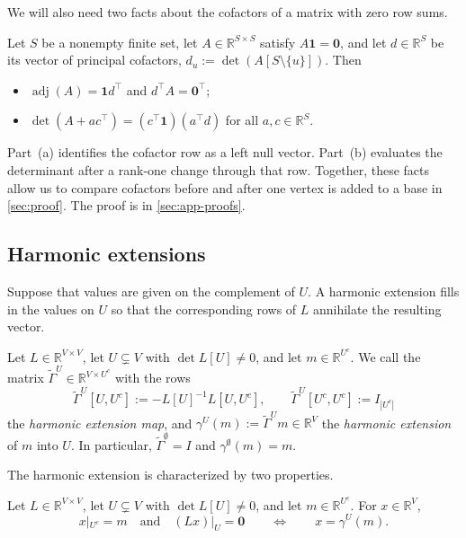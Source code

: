 \documentclass[onefignum,onetabnum,nohypdvips]{siamart250211}
\numberwithin{theorem}{section}
\numberwithin{equation}{section}
\newcommand{\R}{\mathbb{R}}
\newcommand{\one}{\mathbf{1}}
\newcommand{\zero}{\mathbf{0}}
\DeclareMathOperator{\adj}{adj}
\begin{document}
We will also need two facts about the cofactors of a matrix with zero
row sums.

\begin{lemma}\label{lem:adj}
Let $S$ be a nonempty finite set, let $A\in\R^{S\times S}$ satisfy
$A\one=\zero$, and let $d\in\R^S$ be its vector of principal
cofactors, $d_u:=\det(A[S\setminus\{u\}])$. Then
\begin{itemize}
\item[(a)] $\adj(A)=\one d^{\top}$ and $d^{\top}A=\zero^{\top}$;
\item[(b)] $\det(A+ac^{\top})=(c^{\top}\one)(a^{\top}d)$ for all
$a,c\in\R^S$.
\end{itemize}
\end{lemma}

Part~(a) identifies the cofactor row as a left null vector. Part~(b)
evaluates the determinant after a rank-one change through that row.
Together, these facts allow us to compare cofactors before and after
one vertex is added to a base in \cref{sec:proof}. The proof is in
\cref{sec:app-proofs}.


\subsection{Harmonic extensions}\label{sec:gammadef}

Suppose that values are given on the complement of $U$. A harmonic
extension fills in the values on $U$ so that the corresponding rows
of $L$ annihilate the resulting vector. 

\begin{definition}\label{def:gamma}
Let $L\in\R^{V\times V}$, let $U\subsetneq V$ with $\det L[U]\ne0$, and let $m\in\R^{U^c}$. We
call the matrix $\tilde\Gamma^U\in\R^{V\times U^c}$ with the rows
\[
\tilde\Gamma^U[U,U^c]:=-L[U]^{-1}L[U,U^c],\qquad
\tilde\Gamma^U[U^c,U^c]:=I_{|U^c|}
\]
the \emph{harmonic extension map}, and $\gamma^U(m):=\tilde\Gamma^Um\in\R^V$
the \emph{harmonic extension} of $m$ into $U$. In particular,
$\tilde\Gamma^{\emptyset}=I$ and $\gamma^{\emptyset}(m)=m$.
\end{definition}


The harmonic extension is characterized by two properties.
\begin{lemma}\label{lem:harmonic-extension}
Let $L\in\R^{V\times V}$, let $U\subsetneq V$ with $\det L[U]\ne0$, and
let $m\in\R^{U^c}$. For $x\in\R^V$,
\[
x|_{U^c}=m\quad\text{and}\quad(Lx)|_U=\zero
\qquad\Longleftrightarrow\qquad x=\gamma^U(m).
\]
\end{lemma}
\end{document}
